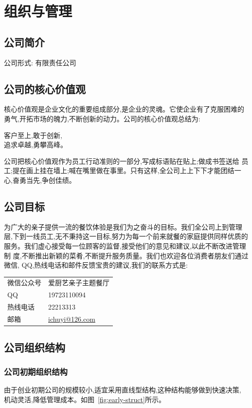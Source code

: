 \chapter{组织与管理}
\section{公司简介}
公司形式: 有限责任公司

\section{公司的核心价值观}
核心价值观是企业文化的重要组成部分,是企业的灵魂。它使企业有了克服困难的
勇气,开拓市场的魄力,不断创新的动力。公司的核心价值观总结为:
%
\begin{center}
        客户至上,敢于创新,\\追求卓越,勇攀高峰。
\end{center}
%
公司把核心价值观作为员工行动准则的一部分,写成标语贴在贴上;做成书签送给
员工;提在画上挂在墙上;喊在嘴里做在事里。只有这样,全公司上上下下才能团结一
心,奋勇当先,争创佳绩。

\section{公司目标}
为广大的亲子提供一流的餐饮体验是我们为之奋斗的目标。我们全公司上到管理
层,下到一线员工,无不秉持这一目标,努力为每一个前来就餐的家庭提供同样优质的
服务。我们虚心接受每一位顾客的监督,接受他们的意见和建议,以此不断改进管理制
度,不断推出新颖的菜肴,不断提升服务质量。我们也欢迎各位消费者朋友们通过微信,
QQ,热线电话和邮件反馈宝贵的建议,我们的联系方式是:
\begin{table}
\raggedright
\begin{tabularx}{\textwidth}{ll}
        微信公众号 & 爱厨艺亲子主题餐厅 \tabularnewline
        QQ &  19723110094 \tabularnewline
        热线电话 &  22213313 \tabularnewline
        邮箱 &  \url{ichuyi@126.com} \tabularnewline
\end{tabularx}
\end{table}

\section{公司组织结构}

\subsection{公司初期组织结构}
由于创业初期公司的规模较小,适宜采用直线型结构,这种结构能够做到快速决策,
机动灵活,降低管理成本。如图~\ref{fig:early-struct}所示。

